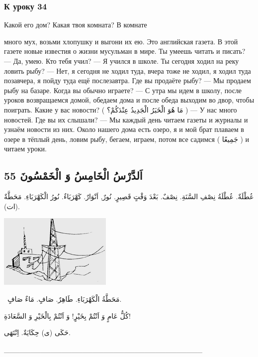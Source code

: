 \documentclass[a5paper]{article}
\begin{document}
\subsubsection{К уроку 34}
Какой его дом? Какая твоя комната? В комнате

много мух, возьми хлопушку и выгони их ею. Это английская газета. В этой газете новые известия о жизни мусульман в мире. Ты умеешь читать и писать? — Да, умею. Кто тебя учил? — Я учился в школе. Ты сегодня ходил на реку ловить рыбу? — Нет, я сегодня не ходил туда, вчера тоже не ходил, я ходил туда позавчера, я пойду туда ещё послезавтра. Где вы продаёте рыбу? — Мы продаем рыбу на базаре. Когда вы обычно играете? — С утра мы идем в школу, после уроков возвращаемся домой, обедаем дома и после обеда выходим во двор, чтобы поиграть. Какие у вас новости? ( مَا هُوَ الْخَبَرُ الْجَدِيدُ عِنْدَكُمْ؟ ) — У нас много новостей. Где вы их слышали? — Мы каждый день читаем газеты и журналы и узнаём новости из них. Около нашего дома есть озеро, я и мой брат плаваем в озере в тёплый день, ловим рыбу, бегаем, играем, потом все садимся ( جَمِيعًا ) и читаем уроки.

\subsection{اَلدَّرْسُ الْخَامِسُ وَ الْخَمْسُونَ 55}
عُطْلَةٌ. عُطْلَةُ نِصْفِ السَّنَةِ. نِصْفٌ. بَعْدَ وَقْتٍ قَصِيرٍ. نُورٌ, اَنْوَارٌ. كَهْرَبَاءٌ. نُورُ الْكَهْرَبَاءِ. مَحَطَّةٌ (ات). 

 \includegraphics[width=2.1354in,height=1.3957in]{MuhammadBagauddinlatinized-img178.png} 

\ مَحَطَّةُ الْكَهْرَبَاءِ. طَاهِرٌ. صَافٍ. مَاءٌ صَافٍ. 

كُلُّ عَامٍ وَ اَنْتُمْ بِخَيْرٍ! وَ اَنْتُمْ بِالْخَيْرِ وَ السَّعَادَةِ! 

حَكَى (ى) حِكَايَةٌ. اِنْتَهَى.

\_\_\_\_\_\_\_\_\_\_\_\_\_\_\_\_\_\_\_\_\_\_\_\_\_\_\_\_\_\_\_\_\_\_\_\_\_\_
\end{document}
